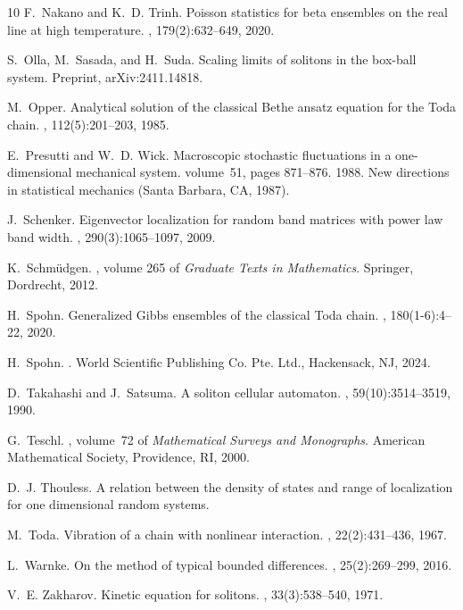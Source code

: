 \documentclass{amsart}
\numberwithin{equation}{section}
\theoremstyle{remark}
\theoremstyle{definition}
\begin{document}
\begin{thebibliography}{10}
		F.~Nakano and K.~D. Trinh.
		\newblock Poisson statistics for beta ensembles on the real line at high
		temperature.
		, 179(2):632--649, 2020.
		
		S.~Olla, M.~Sasada, and H.~Suda.
		\newblock Scaling limits of solitons in the box-ball system.
		\newblock Preprint, ar{X}iv:2411.14818.
		
		M.~Opper.
		\newblock Analytical solution of the classical {B}ethe ansatz equation for the
		{T}oda chain.
		, 112(5):201--203, 1985.
		
		E.~Presutti and W.~D. Wick.
		\newblock Macroscopic stochastic fluctuations in a one-dimensional mechanical
		system.
		\newblock volume~51, pages 871--876. 1988.
		\newblock New directions in statistical mechanics (Santa Barbara, CA, 1987).
		
		J.~Schenker.
		\newblock Eigenvector localization for random band matrices with power law band
		width.
		, 290(3):1065--1097, 2009.
		
		K.~Schm\"udgen.
		, volume 265
		of {\em Graduate Texts in Mathematics}.
		\newblock Springer, Dordrecht, 2012.
		
		H.~Spohn.
		\newblock Generalized {G}ibbs ensembles of the classical {T}oda chain.
		, 180(1-6):4--22, 2020.
		
		H.~Spohn.
		.
		\newblock World Scientific Publishing Co. Pte. Ltd., Hackensack, NJ, 2024.
		
		D.~Takahashi and J.~Satsuma.
		\newblock A soliton cellular automaton.
		, 59(10):3514--3519, 1990.
		
		G.~Teschl.
		,
		volume~72 of {\em Mathematical Surveys and Monographs}.
		\newblock American Mathematical Society, Providence, RI, 2000.
		
		D.~J. Thouless.
		\newblock A relation between the density of states and range of localization
		for one dimensional random systems.
		
		M.~Toda.
		\newblock Vibration of a chain with nonlinear interaction.
		, 22(2):431--436, 1967.
		
		L.~Warnke.
		\newblock On the method of typical bounded differences.
		, 25(2):269--299, 2016.
		
		V.~E. Zakharov.
		\newblock Kinetic equation for solitons.
		, 33(3):538--540, 1971.
		
	\end{thebibliography}
	
	
	
		
\end{document}
